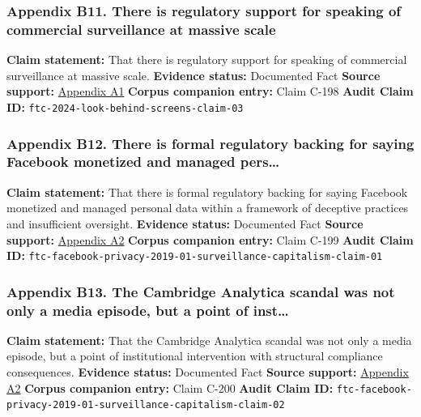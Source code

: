 \documentclass[
  american,
  11pt,
  letterpaper,
]{article}
\begin{document}
\subsubsection{Appendix B11. There is regulatory support for speaking of
commercial surveillance at massive
scale}\label{appendix-b11-there-is-regulatory-support-for-speaking-of-commercial-surveillance-at-massive-scale}

\textbf{Claim statement:} That there is regulatory support for speaking
of commercial surveillance at massive scale. \textbf{Evidence status:}
Documented Fact \textbf{Source support:}
\hyperref[appendix-a1-a-look-behind-the-screens-examining-the-data-practices-of-social-media-and-video-streaming-services]{Appendix
A1} \textbf{Corpus companion entry:} Claim C-198 \textbf{Audit Claim
ID:} \texttt{ftc-2024-look-behind-screens-claim-03}

\subsubsection{Appendix B12. There is formal regulatory backing for
saying Facebook monetized and managed
pers\ldots{}}\label{appendix-b12-there-is-formal-regulatory-backing-for-saying-facebook-monetized-and-managed-pers}

\textbf{Claim statement:} That there is formal regulatory backing for
saying Facebook monetized and managed personal data within a framework
of deceptive practices and insufficient oversight. \textbf{Evidence
status:} Documented Fact \textbf{Source support:}
\hyperref[appendix-a2-ftc-imposes-5-billion-penalty-and-sweeping-new-privacy-restrictions-on-facebook]{Appendix
A2} \textbf{Corpus companion entry:} Claim C-199 \textbf{Audit Claim
ID:}
\texttt{ftc-facebook-privacy-2019-01-surveillance-capitalism-claim-01}

\subsubsection{Appendix B13. The Cambridge Analytica scandal was not
only a media episode, but a point of
inst\ldots{}}\label{appendix-b13-the-cambridge-analytica-scandal-was-not-only-a-media-episode-but-a-point-of-inst}

\textbf{Claim statement:} That the Cambridge Analytica scandal was not
only a media episode, but a point of institutional intervention with
structural compliance consequences. \textbf{Evidence status:} Documented
Fact \textbf{Source support:}
\hyperref[appendix-a2-ftc-imposes-5-billion-penalty-and-sweeping-new-privacy-restrictions-on-facebook]{Appendix
A2} \textbf{Corpus companion entry:} Claim C-200 \textbf{Audit Claim
ID:}
\texttt{ftc-facebook-privacy-2019-01-surveillance-capitalism-claim-02}
\end{document}
